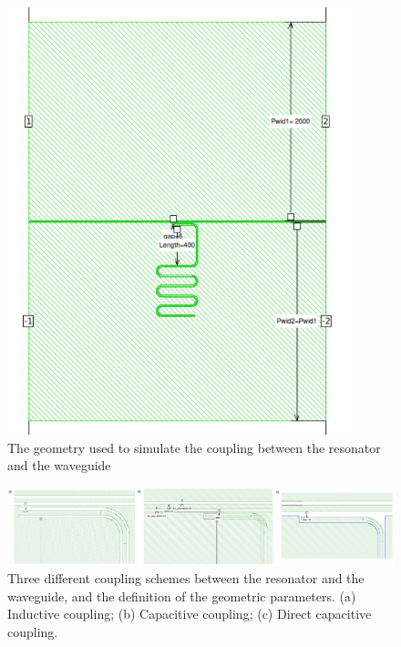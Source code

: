 \documentclass[noshowpacs,amsmath,
superscriptaddress,
10pt]{article}
\begin{document}
\begin{figure}[!ht]
\centering
\includegraphics[width=10cm] {ResCp_geo}
\caption{The geometry used to simulate the coupling between the resonator and the waveguide}
\label{pic:ResCp_geo}
\end{figure}

\begin{figure}[!ht]
\centering
\includegraphics[width=16cm] {Cpl_cfg}
\caption{Three different coupling schemes between the resonator and the waveguide, and the definition of the geometric parameters. (a) Inductive coupling; (b) Capacitive coupling; (c) Direct capacitive coupling. }
\label{pic:Cpl_cfg}
\end{figure}

\end{document}

